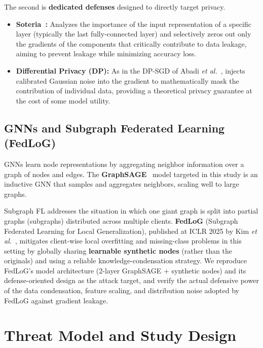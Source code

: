 \documentclass[conference]{IEEEtran}
\begin{document}
The second is \textbf{dedicated defenses} designed to directly target privacy.
\begin{itemize}
\item \textbf{Soteria~\cite{sun2021soteria}:} Analyzes the importance of the
input representation of a specific layer (typically the last fully-connected
layer) and selectively zeros out only the gradients of the components that
critically contribute to data leakage, aiming to prevent leakage while
minimizing accuracy loss.
\item \textbf{Differential Privacy (DP):} As in the DP-SGD of Abadi
\textit{et al.}~\cite{abadi2016dp}, injects calibrated Gaussian noise into the
gradient to mathematically mask the contribution of individual data, providing a
theoretical privacy guarantee at the cost of some model utility.
\end{itemize}

\subsection{GNNs and Subgraph Federated Learning (FedLoG)}
GNNs learn node representations by aggregating neighbor information over a graph
of nodes and edges. The \textbf{GraphSAGE}~\cite{hamilton2017sage} model targeted
in this study is an inductive GNN that samples and aggregates neighbors, scaling
well to large graphs.

Subgraph FL addresses the situation in which one giant graph is split into
partial graphs (subgraphs) distributed across multiple clients.
\textbf{FedLoG} (Subgraph Federated Learning for Local Generalization),
published at ICLR 2025 by Kim \textit{et al.}~\cite{kim2025fedlog}, mitigates
client-wise local overfitting and missing-class problems in this setting by
globally sharing \textbf{learnable synthetic nodes} (rather than the originals)
and using a reliable knowledge-condensation strategy. We reproduce FedLoG's model
architecture (2-layer GraphSAGE + synthetic nodes) and its defense-oriented
design as the attack target, and verify the actual defensive power of the data
condensation, feature scaling, and distribution noise adopted by FedLoG against
gradient leakage.

\section{Threat Model and Study Design}
\end{document}
